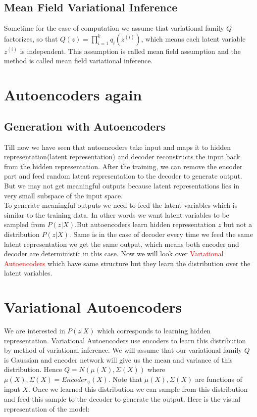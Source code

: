 \documentclass[10pt,a4paper]{article}
\begin{document}
\subsection{Mean Field Variational Inference}
Sometime for the ease of computation we assume that variational family $Q$ factorizes, so that $Q(z) = \prod_{i=1}^{k} q_i(z^{(i)})$, which means each latent variable $z^{(i)}$ is independent. This assumption is called mean field assumption and the method is called mean field variational inference. 

\section{Autoencoders again}
\subsection{Generation with Autoencoders}
Till now we have seen that autoencoders take input and maps it to hidden representation(latent representation) and decoder reconstructs the input back from the hidden representation. After the training, we can remove the encoder part and feed random latent representation to the decoder to generate output. But we may not get meaningful outputs because latent representations lies in very small subspace of the input space.\\
To generate meaningful outputs we need to feed the latent variables which is similar to the training data. In other words we want latent variables to be sampled from $P(z|X)$.But autoencoders learn hidden representation $z$ but not a distribution $P(z|X)$. Same is in the case of decoder every time we feed the same latent representation we get the same output, which means both encoder and decoder are deterministic in this case. Now we will look over \textcolor{red}{Variational Autoencoders} which have same structure but they learn the distribution over the latent variables.

\section{Variational Autoencoders}
We are interested in $P(z|X)$ which corresponds to learning hidden representation. Variational Autoencoders use encoders to learn this distribution by method of variational inference. We will assume that our variational family $Q$ is Gaussian and encoder network will give us the mean and variance of this distribution. Hence $Q = N(\mu(X), \Sigma(X))$ where $\mu(X), \Sigma(X) = Encoder_{\phi}(X)$. Note that $\mu(X), \Sigma(X)$ are functions of input $X$. Once we learned this distribution we can sample from this distribution and feed this sample to the decoder to generate the output. Here is the visual representation of the model:
\end{document}
